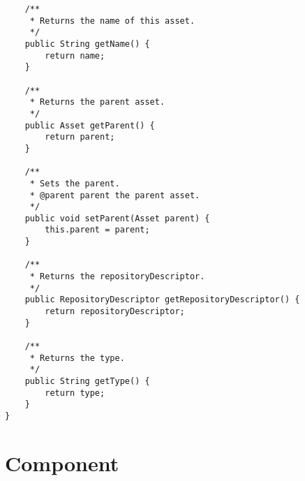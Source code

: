 \begin{verbatim}
	/**
	 * Returns the name of this asset.
	 */
	public String getName() {
		return name;
	}
	
	/**
	 * Returns the parent asset.
	 */
	public Asset getParent() {
		return parent;
	}
	
	/**
	 * Sets the parent.
	 * @parent parent the parent asset.
	 */
	public void setParent(Asset parent) {
		this.parent = parent;
	}
	
	/**
	 * Returns the repositoryDescriptor.
	 */
	public RepositoryDescriptor getRepositoryDescriptor() {
		return repositoryDescriptor;
	}
	
	/**
	 * Returns the type.
	 */
	public String getType() {
		return type;
	}
}
\end{verbatim}
\section{Component}
